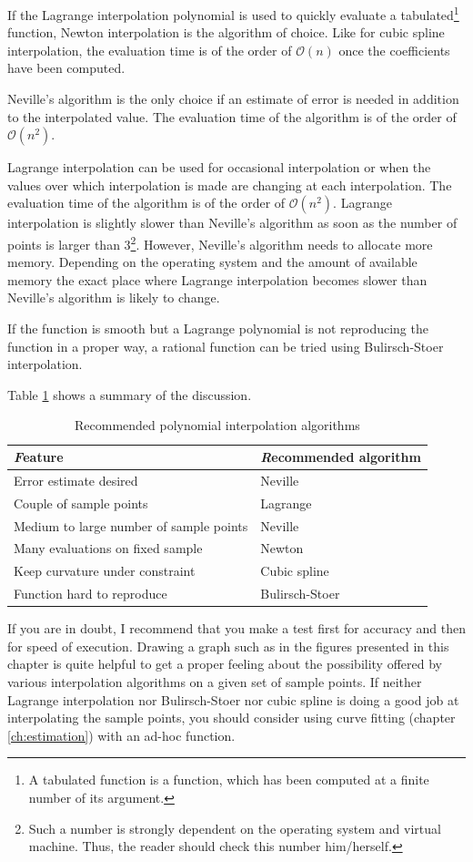 If the Lagrange interpolation polynomial is used to quickly
evaluate a tabulated\footnote{A tabulated function is a function,
which has been computed at a finite number of its argument.}
function, Newton interpolation is the algorithm of choice. Like
for cubic spline interpolation, the evaluation time is of the
order of $\mathcal{O}(n)$ once the coefficients have been computed.

Neville's algorithm is the only choice if an estimate of error is
needed in addition to the interpolated value. The evaluation time
of the algorithm is of the order of $\mathcal{O}(n^2)$.

Lagrange interpolation can be used for occasional interpolation or
when the values over which interpolation is made are changing at
each interpolation. The evaluation time of the algorithm is of the
order of $\mathcal{O}(n^2)$. Lagrange interpolation is slightly slower than
Neville's algorithm as soon as the number of points is larger than
3\footnote{\label{ft:lagnev}Such a number is strongly dependent on
the operating system and virtual machine. Thus, the reader should
check this number him/herself.}. However, Neville's algorithm
needs to allocate more memory. Depending on the operating system
and the amount of available memory the exact place where Lagrange
interpolation becomes slower than Neville's algorithm is likely to
change.

If the function is smooth but a Lagrange polynomial is not
reproducing the function in a proper way, a rational function can
be tried using Bulirsch-Stoer interpolation.

Table \ref{tb:interpol} shows a summary of the discussion.
\begin{table}[h]
  \centering
  \caption{Recommended polynomial interpolation algorithms}\label{tb:interpol}
  \vspace{1 ex}
\begin{tabular}{|l|l|} \hline
  {\textsl Feature} & {\textsl Recommended algorithm} \\ \hline
  Error estimate desired&Neville\\ \hline
  Couple of sample points&Lagrange \\ \hline
  Medium to large number of sample points&Neville \\ \hline
  Many evaluations on fixed sample&Newton\\ \hline
  Keep curvature under constraint&Cubic spline\\ \hline
  Function hard to reproduce&Bulirsch-Stoer\\ \hline
\end{tabular}
\end{table}
If you are in doubt, I recommend that you make a test first for
accuracy and then for speed of execution. Drawing a graph such as
in the figures presented in this chapter is quite helpful to get a
proper feeling about the possibility offered by various
interpolation algorithms on a given set of sample points. If
neither Lagrange interpolation nor Bulirsch-Stoer nor cubic spline
is doing a good job at interpolating the sample points, you should
consider using curve fitting (\cf chapter \ref{ch:estimation})
with an ad-hoc function.

